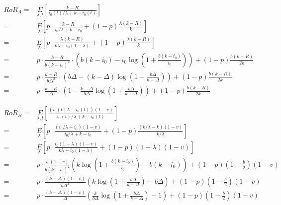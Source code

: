 \begin{align*}
RoR_A =& \underset{\lambda, t}E\left[\frac{k-R}{i_0(t)/\lambda + k - i_0(t)}\right]\\
                                       =& \underset{\lambda}E\left[p\cdot\frac{k-R}{i_0/\lambda + k - i_0} + (1-p)\frac{\lambda(k-R)}{k}\right]\\
                                       =& \underset{\lambda}E\left[p\cdot\frac{\lambda(k-R)}{k\lambda + i_0(1-\lambda)} + (1-p)\frac{\lambda(k-R)}{k}\right]\\
                                       =& p\cdot\frac{k-R}{b(k-i_0)^2}\cdot\left(b(k-i_0) - i_0 \log\left(1 + \frac{b(k-i_0)}{i_0}\right)\right) + (1-p)\frac{b(k-R)}{2k}\\
                                       =& p\cdot\frac{k-R}{b\Delta^2}\cdot\left(b\Delta - (k-\Delta)\log\left(1+\frac{b\Delta}{k-\Delta}\right)\right) + (1-p)\frac{b(k-R)}{2k}\\
                                       =& p\cdot\frac{k-R}{\Delta}\cdot\left(1 - \frac{k-\Delta}{b\Delta}\log\left(1+\frac{b\Delta}{k-\Delta}\right)\right) + (1-p)\frac{b(k-R)}{2k}
\end{align*}

\begin{align*}
RoR_B =& \underset{\lambda, t}E\left[\frac{(i_0(t)\lambda - i_0(t))(1-v)}{i_0(t)/\lambda + k - i_0(t)}\right]\\
                                     =& \underset{\lambda}E\left[p\cdot\frac{(i_0/\lambda - i_0)(1-v)}{i_0/\lambda + k - i_0} + (1-p)\frac{(k/\lambda - k)(1-v)}{k/\lambda}\right]\\
                                     =& \underset{\lambda}E\left[p\cdot\frac{i_0(1-\lambda)(1-v)}{k\lambda + i_0(1-\lambda)} + (1-p)(1-\lambda)(1-v)\right]\\
                                     =& p\cdot\frac{i_0(1-v)}{b(k-i_0)^2}\left(k\log\left(1+\frac{b(k-i_0)}{i_0}\right) - b(k-i_0)\right) + (1-p)(1-\frac{b}{2})(1-v)\\
                                     =& p\cdot\frac{(k-\Delta)(1-v)}{b\Delta^2}\left(k\log\left(1+\frac{b\Delta}{k-\Delta}\right) - b\Delta\right) + (1-p)(1-\frac{b}{2})(1-v)\\
                                     =& p\cdot\frac{(k-\Delta)(1-v)}{\Delta}\left(\frac{k}{b\Delta}\log\left(1+\frac{b\Delta}{k-\Delta}\right) - 1\right) + (1-p)(1-\frac{b}{2})(1-v)\label{eq:rorB_eval}
\end{align*}

